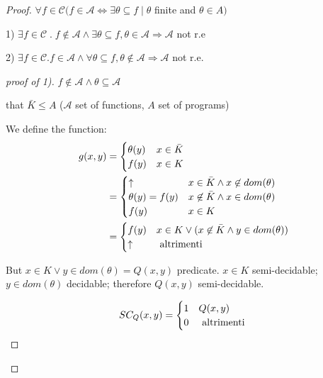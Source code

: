 \begin{proof}

  $ \forall f \in \mathcal{C} (f \in \mathcal{A} \Leftrightarrow
  \exists\theta\subseteq f \mid \theta $ finite and $ \theta\in A)$

  1)
  $ \exists f \in \mathcal{C} \; . \; f \not\in \mathcal{A} \land
  \exists\theta\subseteq f, \theta\in\mathcal{A} \Rightarrow
  \mathcal{A}$ not r.e

  2)
  $ \exists f \in \mathcal{C}. f\in\mathcal{A} \land
  \forall\theta\subseteq f, \theta\not\in\mathcal{A}\Rightarrow
  \mathcal{A} $ not r.e.

  \begin{proof}[proof of 1)]

    $ f\not\in \mathcal{A} \land \theta\subseteq \mathcal{A}$

    that $
    \bar{K}\leq A $ ($ \mathcal{A} $ set of functions, $A$ set of
    programs)

    We define the function:
    \begin{equation*}
      \begin{aligned}
        g(x,y) & = \begin{cases}
          \theta(y) & x \in \bar{K} \\
          f(y) & x \in K
        \end{cases} \\
               & = \begin{cases}
                 \uparrow & x \in \bar{K} \land x \not\in dom(\theta) \\
                 \theta(y) = f(y) & x \not\in \bar{K} \land x \in dom(\theta) \\
                 f(y) & x\in K
               \end{cases}\\
               &= \begin{cases}
                 f(y) & x \in K\lor(x\not\in\bar{K}\land y\in dom(\theta)) \\
                 \uparrow & $ altrimenti $
               \end{cases}
      \end{aligned}
    \end{equation*}

    But $ x\in K\lor y\in dom(\theta) = Q(x,y)$ predicate. $ x\in K $
    semi-decidable; $ y \in dom(\theta) $ decidable; therefore $ Q(x,y) $
    semi-decidable.

    \begin{equation*}
      SC_Q(x,y) = \begin{cases}
        1 & Q(x,y) \\
        0 & $ altrimenti $
      \end{cases}
    \end{equation*}


\end{proof}
\end{proof}
